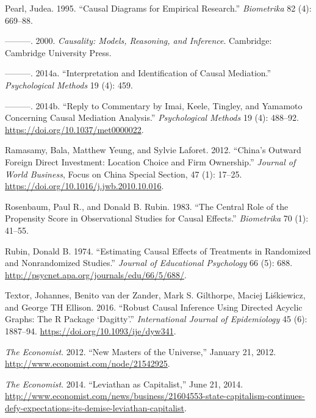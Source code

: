 \documentclass[11pt,]{book}
\begin{document}
\leavevmode\hypertarget{ref-pearl_causal_1995}{}%
Pearl, Judea. 1995. ``Causal Diagrams for Empirical Research.'' \emph{Biometrika} 82 (4): 669--88.

\leavevmode\hypertarget{ref-pearl_causality_2000}{}%
---------. 2000. \emph{Causality: Models, Reasoning, and Inference}. Cambridge: Cambridge University Press.

\leavevmode\hypertarget{ref-pearl_interpretation_2014}{}%
---------. 2014a. ``Interpretation and Identification of Causal Mediation.'' \emph{Psychological Methods} 19 (4): 459.

\leavevmode\hypertarget{ref-pearl_reply_2014}{}%
---------. 2014b. ``Reply to Commentary by Imai, Keele, Tingley, and Yamamoto Concerning Causal Mediation Analysis.'' \emph{Psychological Methods} 19 (4): 488--92. \url{https://doi.org/10.1037/met0000022}.

\leavevmode\hypertarget{ref-ramasamy_chinas_2012}{}%
Ramasamy, Bala, Matthew Yeung, and Sylvie Laforet. 2012. ``China's Outward Foreign Direct Investment: Location Choice and Firm Ownership.'' \emph{Journal of World Business}, Focus on China Special Section, 47 (1): 17--25. \url{https://doi.org/10.1016/j.jwb.2010.10.016}.

\leavevmode\hypertarget{ref-rosenbaum_central_1983}{}%
Rosenbaum, Paul R., and Donald B. Rubin. 1983. ``The Central Role of the Propensity Score in Observational Studies for Causal Effects.'' \emph{Biometrika} 70 (1): 41--55.

\leavevmode\hypertarget{ref-rubin_estimating_1974}{}%
Rubin, Donald B. 1974. ``Estimating Causal Effects of Treatments in Randomized and Nonrandomized Studies.'' \emph{Journal of Educational Psychology} 66 (5): 688. \url{http://psycnet.apa.org/journals/edu/66/5/688/}.

\leavevmode\hypertarget{ref-textor_robust_2016}{}%
Textor, Johannes, Benito van der Zander, Mark S. Gilthorpe, Maciej Liśkiewicz, and George TH Ellison. 2016. ``Robust Causal Inference Using Directed Acyclic Graphs: The R Package `Dagitty'.'' \emph{International Journal of Epidemiology} 45 (6): 1887--94. \url{https://doi.org/10.1093/ije/dyw341}.

\leavevmode\hypertarget{ref-noauthor_new_2012}{}%
\emph{The Economist}. 2012. ``New Masters of the Universe,'' January 21, 2012. \url{http://www.economist.com/node/21542925}.

\leavevmode\hypertarget{ref-noauthor_leviathan_2014}{}%
\emph{The Economist}. 2014. ``Leviathan as Capitalist,'' June 21, 2014. \url{http://www.economist.com/news/business/21604553-state-capitalism-continues-defy-expectations-its-demise-leviathan-capitalist}.
\end{document}
